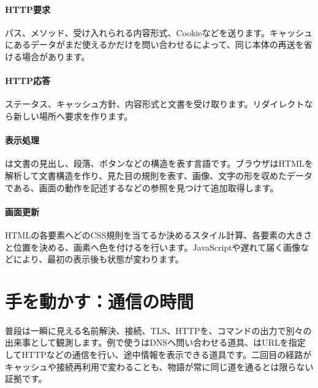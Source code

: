 \begingroup
\begingroup
\paragraph{HTTP要求}
        パス、メソッド、受け入れられる内容形式、Cookieなどを送ります。キャッシュにあるデータがまだ使えるかだけを問い合わせるによって、同じ本体の再送を省ける場合があります。

\paragraph{HTTP応答}
        ステータス、キャッシュ方針、内容形式と文書を受け取ります。リダイレクトなら新しい場所へ要求を作ります。

\par
\endgroup
\medskip
\begingroup
\paragraph{表示処理}
        は文書の見出し、段落、ボタンなどの構造を表す言語です。ブラウザはHTMLを解析して文書構造を作り、見た目の規則を表す、画像、文字の形を収めたデータである、画面の動作を記述するなどの参照を見つけて追加取得します。

\paragraph{画面更新}
        HTMLの各要素へどのCSS規則を当てるか決めるスタイル計算、各要素の大きさと位置を決める、画素へ色を付けるを行います。JavaScriptや遅れて届く画像などにより、最初の表示後も状態が変わります。

\par
\endgroup
\par
\endgroup


\section{手を動かす：通信の時間}
\label{sec:05-network-21}

普段は一瞬に見える名前解決、接続、TLS、HTTPを、コマンドの出力で別々の出来事として観測します。例で使うはDNSへ問い合わせる道具、はURLを指定してHTTPなどの通信を行い、途中情報を表示できる道具です。二回目の経路がキャッシュや接続再利用で変わることも、物語が常に同じ道を通るとは限らない証拠です。

